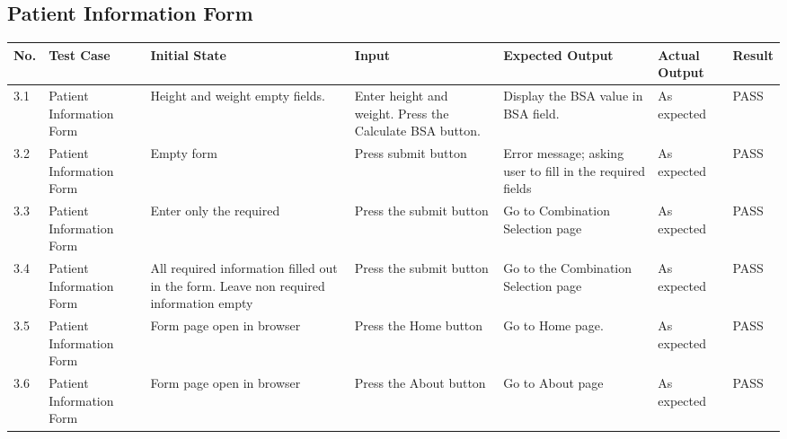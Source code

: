 \documentclass[12pt]{article}
\begin{document}
\subsection{Patient Information Form}
\begin{center}
    \begin{tabular}{ |p{0.5cm}|p{1.5cm}|p{3cm}|p{2cm}|p{2.5cm}|p{2.5cm}|p{1cm}|}
    \hline
    \textbf{No.} & \textbf{Test Case} & \textbf{Initial State} & \textbf{Input} & \textbf{Expected Output} & \textbf{Actual Output} & \textbf{Result} \\ \hline
 3.1 & Patient Information Form & Height and weight empty fields. & Enter height and weight. Press the Calculate BSA button. & Display the BSA value in BSA field. & As expected &  PASS \\ \hline
 3.2 & Patient Information Form & Empty form & Press submit button & Error message; asking user to fill in the required fields & As expected &  PASS \\ \hline
 3.3 & Patient Information Form & Enter only the required & Press the submit button & Go to Combination Selection page & As expected &  PASS \\ \hline
 3.4 & Patient Information Form & All required information filled out in the form. Leave non required information empty & Press the submit button & Go to the Combination Selection page & As expected &  PASS \\ \hline
 3.5 & Patient Information Form & Form page open in browser & Press the Home button & Go to Home page. & As expected &  PASS \\ \hline
 3.6 & Patient Information Form & Form page open in browser & Press the About button & Go to About page & As expected &  PASS \\ \hline
    \end{tabular}
\end{center}
\newpage
\end{document}
